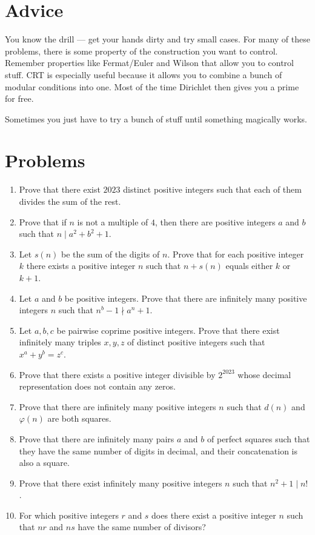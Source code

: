 \documentclass{article}
\begin{document}
\section{Advice}
You know the drill --- get your hands dirty and try small cases. For many of
these problems, there is some property of the construction you want to control.
Remember properties like Fermat/Euler and Wilson that allow you to control stuff.
CRT is especially useful because it allows
you to combine a bunch of modular conditions into one. Most of the time
Dirichlet then gives you a prime for free.

Sometimes you just have to try a bunch of stuff until something magically works.
\section{Problems}
\begin{enumerate}
  \item Prove that there exist $2023$ distinct positive integers such that each of them
    divides the sum of the rest.
  \item Prove that if $n$ is not a multiple of $4$, then there are positive
    integers $a$ and $b$ such that $n\mid a^2+b^2+1$.
  \item Let $s(n)$ be the sum of the digits of $n$. Prove that for each positive
    integer $k$ there exists a positive integer $n$ such that $n+s(n)$ equals
    either $k$ or $k+1$.
  \item Let $a$ and $b$ be positive integers. Prove that there are infinitely
    many positive integers $n$ such that $n^b-1\nmid a^n+1$.
  \item Let $a,b,c$ be pairwise coprime positive integers. Prove that there
    exist infinitely many triples $x,y,z$ of distinct positive integers such
    that $x^a+y^b=z^c$.
  \item Prove that there exists a positive integer divisible by $2^{2023}$ whose
    decimal representation does not contain any zeros.
  \item Prove that there are infinitely many positive integers $n$ such that
    $d(n)$ and $\varphi(n)$ are both squares.
  \item Prove that there are infinitely many pairs $a$ and $b$ of perfect
    squares such that they have the same number of digits in decimal, and their
    concatenation is also a square.
  \item Prove that there exist infinitely many positive integers $n$ such that
    $n^2+1\mid n!$.
  \item For which positive integers $r$ and $s$ does there exist a positive
    integer $n$ such that $nr$ and $ns$ have the same number of divisors?
\end{enumerate}
\newpage
\end{document}
